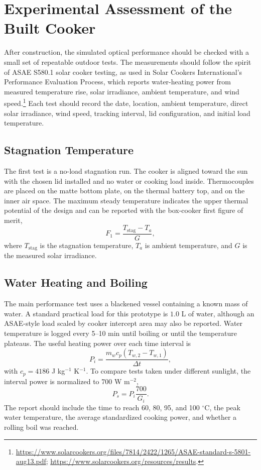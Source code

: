 \section{Experimental Assessment of the Built Cooker}
\label{sec:experimental_assessment}

After construction, the simulated optical performance should be checked with a small set of
repeatable outdoor tests.  The measurements should follow the spirit of ASAE S580.1 solar
cooker testing, as used in Solar Cookers International's Performance Evaluation Process,
which reports water-heating power from measured temperature rise, solar irradiance, ambient
temperature, and wind speed.\footnote{\url{https://www.solarcookers.org/files/7814/2422/1265/ASAE-standard-s-5801-aug13.pdf};
\url{https://www.solarcookers.org/resources/results}.}  Each test should record the date,
location, ambient temperature, direct solar irradiance, wind speed, tracking interval, lid
configuration, and initial load temperature.

\subsection{Stagnation Temperature}

The first test is a no-load stagnation run.  The cooker is aligned toward the sun with the
chosen lid installed and no water or cooking load inside.  Thermocouples are placed on the
matte bottom plate, on the thermal battery top, and on the inner air space.  The maximum
steady temperature indicates the upper thermal potential of the design and can be reported
with the box-cooker first figure of merit,
\begin{equation}
  F_1 = \frac{T_\mathrm{stag} - T_a}{G},
\end{equation}
where $T_\mathrm{stag}$ is the stagnation temperature, $T_a$ is ambient temperature, and
$G$ is the measured solar irradiance.

\subsection{Water Heating and Boiling}

The main performance test uses a blackened vessel containing a known mass of water.  A
standard practical load for this prototype is $1.0$ L of water, although an ASAE-style load
scaled by cooker intercept area may also be reported.  Water temperature is logged every
5--10 min until boiling or until the temperature plateaus.  The useful heating power over each
time interval is
\begin{equation}
  P_i = \frac{m_w c_p (T_{w,2}-T_{w,1})}{\Delta t},
\end{equation}
with $c_p = 4186$ J kg$^{-1}$ K$^{-1}$.  To compare tests taken under different sunlight,
the interval power is normalized to 700 W m$^{-2}$,
\begin{equation}
  P_s = P_i \frac{700}{G_i}.
\end{equation}
The report should include the time to reach 60, 80, 95, and 100 $^\circ$C, the peak water
temperature, the average standardized cooking power, and whether a rolling boil was reached.

